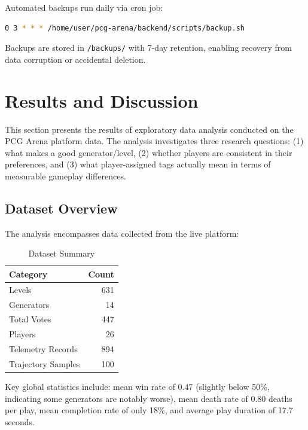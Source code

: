 \documentclass[11pt,a4paper]{article}
\theoremstyle{plain}
\theoremstyle{definition}
\theoremstyle{remark}
\begin{document}
Automated backups run daily via cron job:
\begin{lstlisting}[language=bash]
0 3 * * * /home/user/pcg-arena/backend/scripts/backup.sh
\end{lstlisting}

Backups are stored in \texttt{/backups/} with 7-day retention, enabling recovery from data corruption or accidental deletion.

\section{Results and Discussion}
\label{sec:results}

This section presents the results of exploratory data analysis conducted on the PCG Arena platform data. The analysis investigates three research questions: (1) what makes a good generator/level, (2) whether players are consistent in their preferences, and (3) what player-assigned tags actually mean in terms of measurable gameplay differences.

\subsection{Dataset Overview}
\label{subsec:dataset-overview}

The analysis encompasses data collected from the live platform:

\begin{table}[H]
\centering
\caption{Dataset Summary}
\label{tab:dataset-summary}
\begin{tabular}{lr}
\toprule
\textbf{Category} & \textbf{Count} \\
\midrule
Levels & 631 \\
Generators & 14 \\
Total Votes & 447 \\
Players & 26 \\
Telemetry Records & 894 \\
Trajectory Samples & 100 \\
\bottomrule
\end{tabular}
\end{table}

Key global statistics include: mean win rate of 0.47 (slightly below 50\%, indicating some generators are notably worse), mean death rate of 0.80 deaths per play, mean completion rate of only 18\%, and average play duration of 17.7 seconds.
\end{document}
